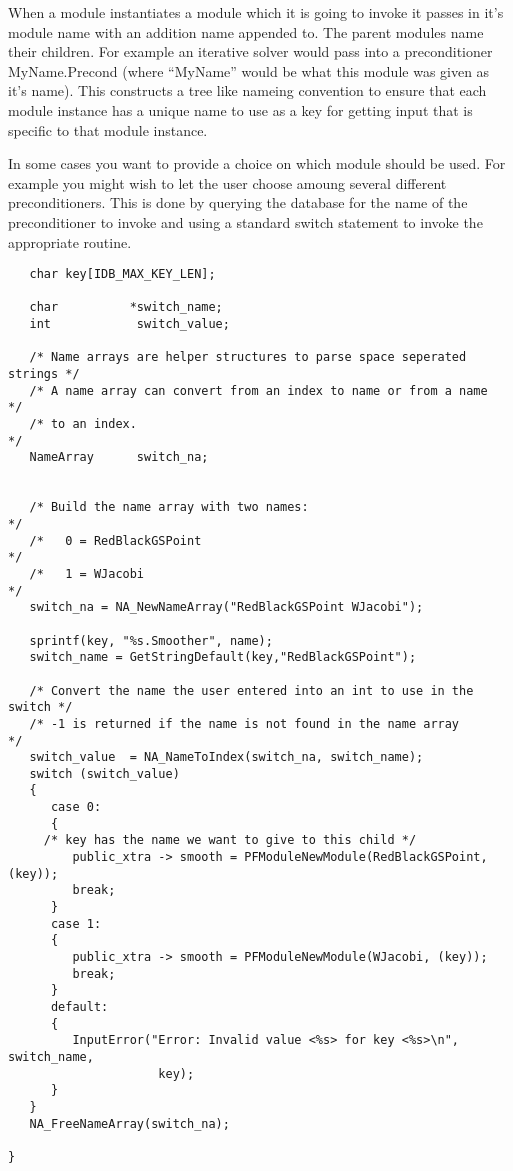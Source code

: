 When a module instantiates a module which it is going to invoke it
passes in it's module name with an addition name appended to.  The
parent modules name their children.  For example an iterative solver
would pass into a preconditioner MyName.Precond (where ``MyName''
would be what this module was given as it's name).  This constructs a
tree like nameing convention to ensure that each module instance has a
unique name to use as a key for getting input that is specific to that
module instance.

In some cases you want to provide a choice on which module should be used.
For example you might wish to let the user choose amoung several different
preconditioners.  This is done by querying the database for the name
of the preconditioner to invoke and using a standard switch statement to
invoke the appropriate  routine.

\begin{display}\begin{verbatim}
   char key[IDB_MAX_KEY_LEN];

   char          *switch_name;
   int            switch_value;

   /* Name arrays are helper structures to parse space seperated strings */
   /* A name array can convert from an index to name or from a name      */
   /* to an index.                                                       */
   NameArray      switch_na;

	
   /* Build the name array with two names:                               */
   /*   0 = RedBlackGSPoint                                              */
   /*   1 = WJacobi                                                      */
   switch_na = NA_NewNameArray("RedBlackGSPoint WJacobi");

   sprintf(key, "%s.Smoother", name);
   switch_name = GetStringDefault(key,"RedBlackGSPoint");

   /* Convert the name the user entered into an int to use in the switch */
   /* -1 is returned if the name is not found in the name array          */
   switch_value  = NA_NameToIndex(switch_na, switch_name);
   switch (switch_value)
   {
      case 0:
      {
	 /* key has the name we want to give to this child */
         public_xtra -> smooth = PFModuleNewModule(RedBlackGSPoint, (key));
         break;
      }
      case 1:
      {
         public_xtra -> smooth = PFModuleNewModule(WJacobi, (key));
         break;
      }
      default:
      {
         InputError("Error: Invalid value <%s> for key <%s>\n", switch_name,
                     key);
      }
   }
   NA_FreeNameArray(switch_na);

}
\end{verbatim}\end{display}
